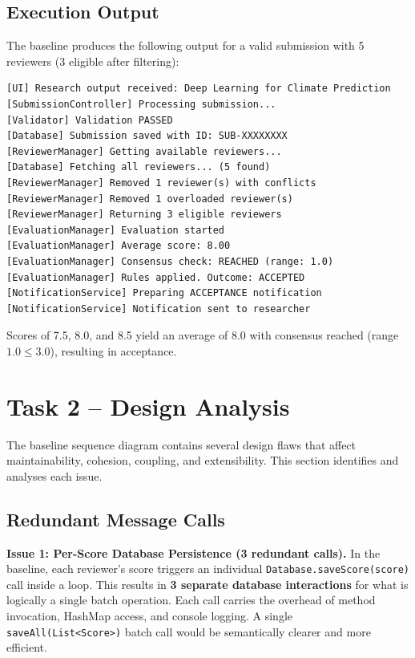 \documentclass[12pt, a4paper]{article}
\begin{document}
\subsection{Execution Output}

The baseline produces the following output for a valid submission with 5 reviewers (3 eligible after filtering):

\begin{lstlisting}[style=outputstyle]
[UI] Research output received: Deep Learning for Climate Prediction
[SubmissionController] Processing submission...
[Validator] Validation PASSED
[Database] Submission saved with ID: SUB-XXXXXXXX
[ReviewerManager] Getting available reviewers...
[Database] Fetching all reviewers... (5 found)
[ReviewerManager] Removed 1 reviewer(s) with conflicts
[ReviewerManager] Removed 1 overloaded reviewer(s)
[ReviewerManager] Returning 3 eligible reviewers
[EvaluationManager] Evaluation started
[EvaluationManager] Average score: 8.00
[EvaluationManager] Consensus check: REACHED (range: 1.0)
[EvaluationManager] Rules applied. Outcome: ACCEPTED
[NotificationService] Preparing ACCEPTANCE notification
[NotificationService] Notification sent to researcher
\end{lstlisting}

Scores of 7.5, 8.0, and 8.5 yield an average of 8.0 with consensus reached (range $1.0 \leq 3.0$), resulting in acceptance.

\section{Task 2 -- Design Analysis}
\label{sec:task2}

The baseline sequence diagram contains several design flaws that affect maintainability, cohesion, coupling, and extensibility. This section identifies and analyses each issue.

\subsection{Redundant Message Calls}

\textbf{Issue 1: Per-Score Database Persistence (3 redundant calls).}
In the baseline, each reviewer's score triggers an individual \texttt{Database.saveScore(score)} call inside a loop. This results in \textbf{3 separate database interactions} for what is logically a single batch operation. Each call carries the overhead of method invocation, HashMap access, and console logging. A single \texttt{saveAll(List<Score>)} batch call would be semantically clearer and more efficient.
\end{document}
